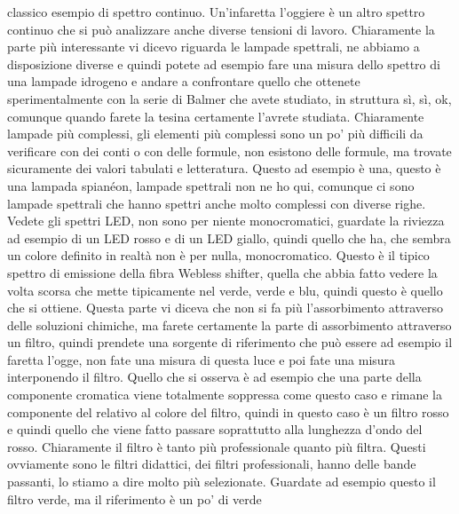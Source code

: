 classico esempio di spettro continuo. Un'infaretta l'oggiere è un altro spettro continuo che si può analizzare anche diverse tensioni di lavoro. Chiaramente la parte più interessante vi dicevo riguarda le lampade spettrali, ne abbiamo a disposizione diverse e quindi potete ad esempio fare una misura dello spettro di una lampade idrogeno e andare a confrontare quello che ottenete sperimentalmente con la serie di Balmer che avete studiato, in struttura sì, sì, ok, comunque quando farete la tesina certamente l'avrete studiata. Chiaramente lampade più complessi, gli elementi più complessi sono un po' più difficili da verificare con dei conti o con delle formule, non esistono delle formule, ma trovate sicuramente dei valori tabulati e letteratura. Questo ad esempio è una, questo è una lampada spianéon, lampade spettrali non ne ho qui, comunque ci sono lampade spettrali che hanno spettri anche molto complessi con diverse righe. Vedete gli spettri LED, non sono per niente monocromatici, guardate la riviezza ad esempio di un LED rosso e di un LED giallo, quindi quello che ha, che sembra un colore definito in realtà non è per nulla, monocromatico. Questo è il tipico spettro di emissione della fibra Webless shifter, quella che abbia fatto vedere la volta scorsa che mette tipicamente nel verde, verde e blu, quindi questo è quello che si ottiene. Questa parte vi diceva che non si fa più l'assorbimento attraverso delle soluzioni chimiche, ma farete certamente la parte di assorbimento attraverso un filtro, quindi prendete una sorgente di riferimento che può essere ad esempio il faretta l'ogge, non fate una misura di questa luce e poi fate una misura interponendo il filtro. Quello che si osserva è ad esempio che una parte della componente cromatica viene totalmente soppressa come questo caso e rimane la componente del relativo al colore del filtro, quindi in questo caso è un filtro rosso e quindi quello che viene fatto passare soprattutto alla lunghezza d'ondo del rosso. Chiaramente il filtro è tanto più professionale quanto più filtra. Questi ovviamente sono le filtri didattici, dei filtri professionali, hanno delle bande passanti, lo stiamo a dire molto più selezionate. Guardate ad esempio questo il filtro verde, ma il riferimento è un po' di verde 

